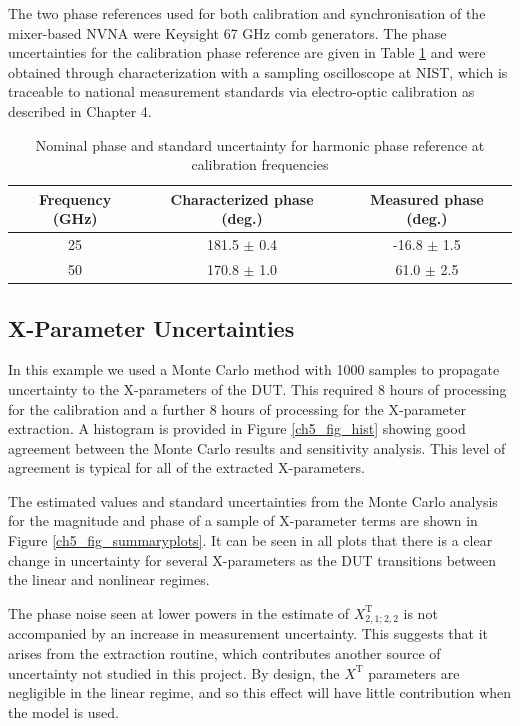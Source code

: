 \documentclass[../thesis/thesis.tex]{subfiles}
\begin{document}
The two phase references used for both calibration and synchronisation of the mixer-based NVNA were Keysight 67 GHz comb generators\cite{Keysight_2014}. The phase uncertainties for the calibration phase reference are given in Table \ref{ch5_table_phaseunc} and were obtained through characterization with a sampling oscilloscope at NIST, which is traceable to national measurement standards via electro-optic calibration \cite{Reader_2008, Hale_2009} as described in Chapter 4.

\begin{table}[]
	\centering
	\caption{Nominal phase and standard uncertainty for harmonic phase reference at calibration frequencies}
	\label{ch5_table_phaseunc}
	\begin{tabular}{ccc}
		\hline
		Frequency (GHz) & Characterized phase (deg.) & Measured phase (deg.)\\ \hline
		25 & 181.5 $\pm$ 0.4 & -16.8 $\pm$ 1.5 \\ 
		50 & 170.8 $\pm$ 1.0 & 61.0 $\pm$ 2.5 \\ 
		\hline
	\end{tabular}
\end{table}

\subsection{X-Parameter Uncertainties}

In this example we used a Monte Carlo method with 1000 samples to propagate uncertainty to the X-parameters of the DUT. This required 8 hours of processing for the calibration and a further 8 hours of processing for the X-parameter extraction. A histogram is provided in Figure \ref{ch5_fig_hist} showing good agreement between the Monte Carlo results and sensitivity analysis. This level of agreement is typical for all of the extracted X-parameters.

The estimated values and standard uncertainties from the Monte Carlo analysis for the magnitude and phase of a sample of X-parameter terms are shown in Figure \ref{ch5_fig_summaryplots}. It can be seen in all plots that there is a clear change in uncertainty for several X-parameters as the DUT transitions between the linear and nonlinear regimes.

The phase noise seen at lower powers in the estimate of $X^\textrm{T}_{2,1;2,2}$ is not accompanied by an increase in measurement uncertainty. This suggests that it arises from the extraction routine, which contributes another source of uncertainty not studied in this project. By design, the $X^\textrm{T}$ parameters are negligible in the linear regime, and so this effect will have little contribution when the model is used.
\end{document}
